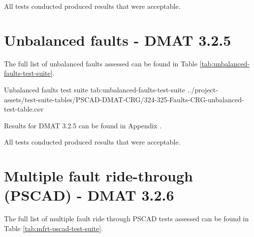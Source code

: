 \documentclass{../grid-link-report}
\newcommand{\projectassetsdir}{../project-assets}
\begin{document}
	All tests conducted produced results that were acceptable.
	
	
	\section{Unbalanced faults - DMAT 3.2.5}
	\label{sec:unbalanced-faults}
	
	
	The full list of unbalanced faults assessed can be found in Table \ref{tab:unbalanced-faults-test-suite}.
	
	{
		\fontsize{5}{7}\selectfont
		\autoscaledlongtable
		{Unbalanced faults test suite}
		{tab:unbalanced-faults-test-suite}
		{\projectassetsdir/test-suite-tables/PSCAD-DMAT-CRG/324-325-Faults-CRG-unbalanced-test-table.csv}
	}
	
	Results for DMAT 3.2.5 can be found in Appendix .
	
	All tests conducted produced results that were acceptable.
	
	
	
	\section{Multiple fault ride-through (PSCAD) - DMAT 3.2.6}
	
	
	
	The full list of multiple fault ride through PSCAD tests assessed can be found in Table \ref{tab:mfrt-pscad-test-suite}.
	
\end{document}
